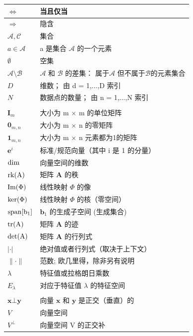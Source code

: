 \begin{longtable}{>{\raggedright\arraybackslash}p{\dimexpr(\textwidth-24pt)/2\relax} >{\raggedright\arraybackslash}p{\dimexpr(\textwidth-24pt)/2\relax}}
$\Longleftrightarrow$ & 当且仅当 \\ \hline
$\Longrightarrow$ & 隐含 \\ \hline
$\mathcal A, \mathcal C$ & 集合 \\ \hline
$a \in \mathcal A$ & a 是集合 $\mathcal A$ 的一个元素 \\ \hline
$\emptyset$ & 空集 \\ \hline
$\mathcal A \setminus \mathcal B$ & $\mathcal A$ 和 $\mathcal B$ 的差集： 属于$\mathcal A$ 但不属于$\mathcal B$的元素集合 \\ \hline
$D$ & 维数； 由 d = 1,...,D 索引 \\ \hline
$N$ & 数据点的数量； 由 n = 1,...,N 索引 \\ \hline
 &  \\ \hline
$\boldsymbol{I}_m$ & 大小为 m × m 的单位矩阵 \\ \hline
$\boldsymbol{0}_{m,n}$ & 大小为 m × n 的零矩阵 \\ \hline
$\boldsymbol{1}_{m,n}$ & 大小为 m × n 元素都为1的矩阵 \\ \hline
$\boldsymbol{e}^i$ & 标准/规范向量（其中 i 是 1 的分量） \\ \hline
$\rm dim$ & 向量空间的维数 \\ \hline
$\rm rk(\boldsymbol{A})$ & 矩阵 $\boldsymbol{A}$ 的秩 \\ \hline
$\rm Im(\Phi)$ & 线性映射 $\Phi$ 的像 \\ \hline
$\rm ker(\Phi)$ & 线性映射 $\Phi$ 的核（零空间） \\ \hline
$\rm span[\boldsymbol{b}_1]$ & $\boldsymbol{b}_1$ 的生成子空间 (生成集合) \\ \hline
$\rm tr(\boldsymbol{A})$ & 矩阵 $\boldsymbol{A}$ 的迹 \\ \hline
$\rm det(\boldsymbol{A})$ & 矩阵 $\boldsymbol{A}$ 的行列式 \\ \hline
$\lvert {·} \rvert$ & 绝对值或者行列式（取决于上下文） \\ \hline
$\lVert {·} \rVert$ & 范数; 欧几里得，除非另有说明 \\ \hline
$\lambda$ & 特征值或拉格朗日乘数 \\ \hline
$E_\lambda$ & 对应于特征值 $\lambda$ 的特征空间 \\ \hline
 &  \\ \hline
$\boldsymbol{x} \bot \boldsymbol{y}$ & 向量 $\boldsymbol{x}$ 和 $\boldsymbol{y}$ 是正交（垂直）的 \\ \hline
$V$ & 向量空间 \\ \hline
$V^\bot$ & 向量空间 V 的正交补 \\ \hline

\end{longtable}
